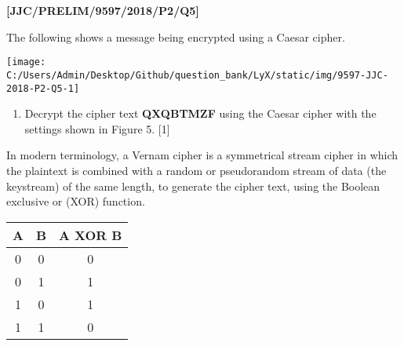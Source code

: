 \item \textbf{{[}JJC/PRELIM/9597/2018/P2/Q5{]} }

The following shows a message being encrypted using a Caesar cipher.
\begin{center}
\texttt{[image: C:/Users/Admin/Desktop/Github/question\_bank/LyX/static/img/9597-JJC-2018-P2-Q5-1]}
\par\end{center}
\begin{enumerate}
\item Decrypt the cipher text \textquotedbl\textbf{QXQBTMZF}\textquotedbl{}
using the Caesar cipher with the settings shown in Figure 5. \hfill{}{[}1{]}
\end{enumerate}
In modern terminology, a Vernam cipher is a symmetrical stream cipher
in which the plaintext is combined with a random or pseudorandom stream
of data (the \textquotedbl keystream\textquotedbl ) of the same
length, to generate the cipher text, using the Boolean \textquotedbl exclusive
or\textquotedbl{} (XOR) function. 
\noindent \begin{center}
\begin{tabular}{|c|c|c|}
\hline 
A & B & A \textbf{XOR} B\tabularnewline
\hline 
0 & 0 & 0\tabularnewline
\hline 
0 & 1 & 1\tabularnewline
\hline 
1 & 0 & 1\tabularnewline
\hline 
1 & 1 & 0\tabularnewline
\hline 
\end{tabular}
\par\end{center}

